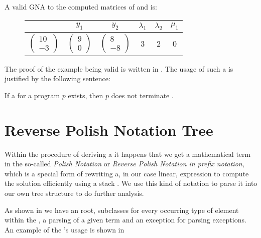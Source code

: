 \begin{example}
	A valid GNA to the computed matrices of  and  is:\newline
	\begin{figure}[H]
		\centering
		\begin{tabular}{|c|c|c|c|c|c|}
			\hline
			\stem & $y_1$ & $y_2$ & $\lambda_1$ & $\lambda_2$ & $\mu_1$ \\ \hline
			$\begin{pmatrix} 10 \\ -3 \end{pmatrix}$ & $\begin{pmatrix} 9 \\ 0 \end{pmatrix}$ & $\begin{pmatrix} 8 \\ -8 \end{pmatrix}$ & 3 & 2 & 0 \\ \hline
		\end{tabular}
	\end{figure}
\end{example}
The proof of the example being valid is written in .
The usage of such a \gna is justified by the following sentence:
\begin{satz}
	\label{sen:gna-nonterm}
	If a \gna for a program $p$ exists, then $p$ does not terminate \cite{leike2014geometric}.
\end{satz}

\section{Reverse Polish Notation Tree}
\label{sec:rpntree}
Within the procedure of deriving a \gna it happens that we get a mathematical term in the so-called \textit{Polish Notation} or \textit{Reverse Polish Notation in prefix notation}, which is a special form of rewriting a, in our case linear, expression to compute the solution efficiently using a stack \cite{wikirpn}. We use this kind of notation to parse it into our own tree structure to do further analysis.

As shown in  we have an  root, subclasses for every occurring type of element within the \its, a  parsing of a given term and an exception for parsing exceptions.
An example of the \rpntree's usage is shown in 

